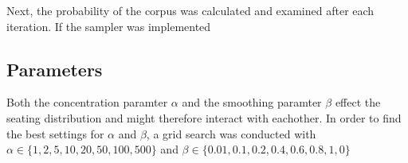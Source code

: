 Next, the probability of the corpus was calculated and examined after each iteration. If the sampler was implemented 

\subsection{Parameters}
Both the concentration paramter $\alpha$ and the smoothing paramter $\beta$ effect the seating distribution and might therefore interact with eachother. In order to find the best settings for $\alpha$ and $\beta$, a grid search was conducted with $\alpha \in \{1, 2, 5, 10, 20, 50, 100, 500 \}$ and $\beta \in \{ 0.01, 0.1, 0.2, 0.4,0.6, 0.8, 1, 0 \}$